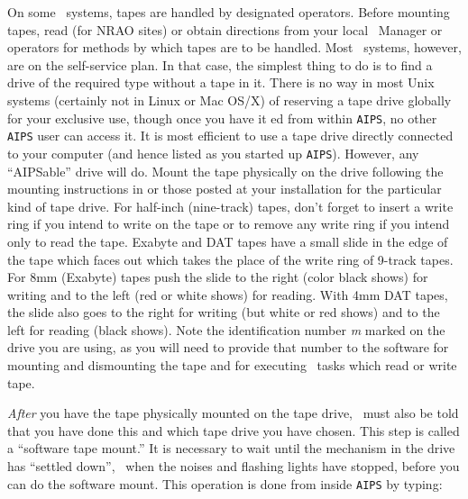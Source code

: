      On some \AIPS\ systems, tapes are handled by designated operators.
Before mounting tapes, read  (for NRAO sites) or obtain
directions from your local \AIPS\ Manager or operators for methods by
which tapes are to be handled.  Most \AIPS\ systems, however, are on
the self-service plan.  In that case, the simplest thing to do is to
find a drive of the required type without a tape in it.  There is no
way in most Unix systems (certainly not in Linux or Mac OS/X) of
reserving a tape drive globally for your exclusive use, though once
you have it {\tt {}}ed from within {\tt AIPS}, no other {\tt
AIPS} user can access it.  It is most efficient to use a tape drive
directly connected to your computer (and hence listed as you started
up \hbox{{\tt AIPS}}).  However, any ``AIPSable'' drive will do.
Mount the tape physically on the drive following the mounting
instructions in  or those posted at your installation for
the particular kind of tape drive.  For half-inch (nine-track) tapes,
don't forget to insert a write ring if you intend to write on the tape
or to remove any write ring if you intend only to read the tape.
Exabyte and DAT tapes have a small slide in the edge of the tape which
faces out which takes the place of the write ring of 9-track tapes.
For 8mm (Exabyte) tapes push the slide to the right (color black
shows) for writing and to the left (red or white shows) for reading.
With 4mm DAT tapes, the slide also goes to the right for writing (but
white or red shows) and to the left for reading (black shows).  Note
the identification number {\it m\/} marked on the drive you are using,
as you will need to provide that number to the software for mounting
and dismounting the tape and for executing \AIPS\ tasks which read or
write tape.


      {\it After\/} you have the tape physically mounted on the tape
drive, \AIPS\ must also be told that you have done this and which tape
drive you have chosen.  This step is called a ``software tape mount.''
It is necessary to wait until the mechanism in the drive has ``settled
down'', \ie\ when the noises and flashing lights have stopped, before
you can do the software mount.  This operation is done from inside
{\tt AIPS} by typing:
\btd
{}
\etd
{}


